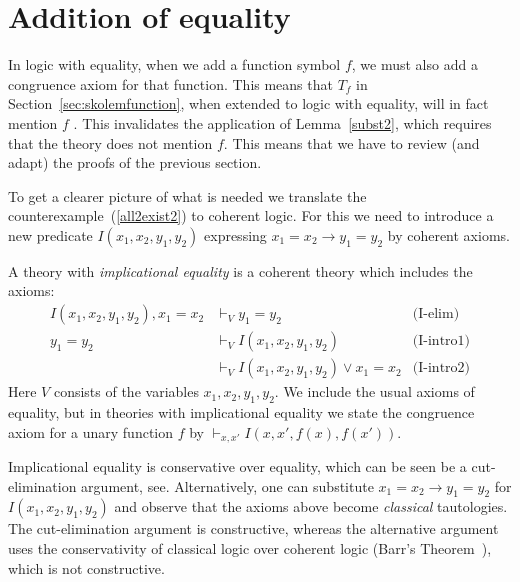 \documentclass[10pt,a4paper]{article}
\begin{document}

\section{Addition of equality}

In logic with equality, when we add a function symbol $f$, 
we must also add a congruence axiom for that function. 
This means that $T_f$ in Section~\ref{sec:skolemfunction},
when extended to  logic with equality, will in fact mention $f$ . 
This invalidates the application of Lemma~\ref{subst2}, 
which requires that the theory does not mention $f$.
This means that we have to review (and adapt) the proofs of the
previous section. 

To get a clearer picture of what is needed we translate the 
counterexample~(\ref{all2exist2}) to coherent logic.
For this we need to introduce a new predicate $I(x_1,x_2,y_1,y_2)$
expressing $x_1=x_2 \to y_1=y_2$ by coherent axioms.

\begin{definition}\label{def:implicational_equality}
A theory with \emph{implicational equality} is a coherent theory which includes
the axioms:
\begin{align*}
 I(x_1,x_2,y_1,y_2), x_1=x_2 & \vdash_V                 y_1=y_2  &\text{(I-elim)}\\
 y_1=y_2                                  &\vdash_V                 I(x_1,x_2,y_1,y_2)&\text{(I-intro1)}\\ 
                                                 &\vdash_V                 I(x_1,x_2,y_1,y_2) \lor x_1= x_2&\text{(I-intro2)}
\end{align*}
Here $V$ consists of  the variables $x_1,x_2,y_1,y_2$.
We include the usual axioms of equality, but
in theories with implicational equality we state the congruence axiom for 
a unary function $f$ by $\vdash_{x,x'} I(x,x',f(x),f(x'))$.
\end{definition}

Implicational equality is conservative over equality, which can be seen be a
cut-elimination argument, see\cite[THM?]{CLR}. 
Alternatively, one can substitute $x_1=x_2 \to y_1=y_2$
for $I(x_1,x_2,y_1,y_2)$ and observe that the axioms above become
\emph{classical} tautologies. The cut-elimination argument is constructive, whereas
the alternative argument uses the conservativity of classical logic over
coherent logic (Barr's Theorem~\cite{Barr}), which is not constructive.
\end{document}
